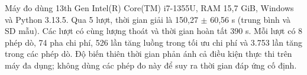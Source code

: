 Máy đo dùng 13th Gen Intel(R) Core(TM) i7-1355U, RAM 15,7 GiB, Windows và Python 3.13.5. Qua 5 lượt, thời gian giải là 150,27 $\pm$ 60,56 s (trung bình và SD mẫu). Các lượt có cùng lượng thoát và thời gian hoàn tất 390 s. Mỗi lượt có 8 phép dò, 74 pha chi phí, 526 lần tăng luồng trong tối ưu chi phí và 3.753 lần tăng trong các phép dò. Độ biến thiên thời gian phản ánh cả điều kiện thực thi trên máy đa dụng; không dùng các phép đo này để suy ra thời gian đáp ứng cố định.
